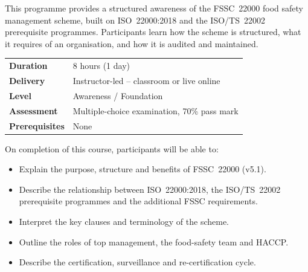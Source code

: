 %

This programme provides a structured awareness of the FSSC~22000 food safety
management scheme, built on ISO~22000:2018 and the ISO/TS~22002 prerequisite
programmes. Participants learn how the scheme is structured, what it requires
of an organisation, and how it is audited and maintained.

\vspace{6pt}
\begin{tabular}{@{}p{3.2cm}p{9cm}@{}}
  \textbf{Duration}   & 8 hours (1 day) \\[2pt]
  \textbf{Delivery}   & Instructor-led -- classroom or live online \\[2pt]
  \textbf{Level}      & Awareness / Foundation \\[2pt]
  \textbf{Assessment} & Multiple-choice examination, 70\% pass mark \\[2pt]
  \textbf{Prerequisites} & None \\
\end{tabular}

On completion of this course, participants will be able to:
\begin{itemize}\setlength\itemsep{1pt}\setlength\parskip{0pt}
  \item Explain the purpose, structure and benefits of FSSC~22000 (v5.1).
  \item Describe the relationship between ISO~22000:2018, the ISO/TS~22002
        prerequisite programmes and the additional FSSC requirements.
  \item Interpret the key clauses and terminology of the scheme.
  \item Outline the roles of top management, the food-safety team and HACCP.
  \item Describe the certification, surveillance and re-certification cycle.
\end{itemize}

